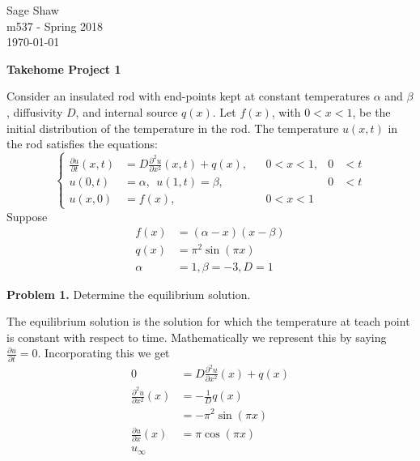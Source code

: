 \documentclass[12pt]{article}
\newcommand{\problem}[1]{\hspace{-4 ex} \large \textbf{Problem #1} }
\begin{document}
	\thispagestyle{empty}
	
	\begin{flushright}
		Sage Shaw \\
		m537 - Spring 2018 \\
		\today
	\end{flushright}
	
{\large \textbf{Takehome Project 1}}\bigbreak

Consider an insulated rod with end-points kept at constant temperatures $\alpha$ and $\beta$, diffusivity $D$, and internal source $q(x)$. Let $f(x)$, with $0<x<1$, be the initial distribution of the temperature in the rod. The temperature $u(x,t)$ in the rod satisfies the equations:
\begin{equation}
 \left \{
	\begin{aligned}
		\frac{\partial u}{\partial t}(x,t) & = D \frac{\partial^2u}{\partial x^2}(x,t) + q(x), && 0 <x <1, & 0&<t \\
		u(0,t) & = \alpha, \ \  u(1,t) = \beta, && & 0 & < t \\
		u(x,0) & = f(x), && 0  < x < 1
	\end{aligned} 
\right .
\end{equation}
Suppose
\begin{align*}
	f(x) & = (\alpha - x)(x- \beta) \\
	 q(x) & = \pi^2\sin(\pi x) \\
	\alpha & = 1, \beta = -3, D=1
\end{align*}

\problem{1.} Determine the equilibrium solution. \bigbreak

The equilibrium solution is the solution for which the temperature at teach point is constant with respect to time. Mathematically we represent this by saying $\frac{\partial u}{\partial t} = 0$. Incorporating this we get
\begin{align*}
0 & = D \frac{\partial^2u}{\partial x^2}(x) + q(x) \\
\frac{\partial^2u}{\partial x^2}(x) & = -\frac{1}{D}q(x) \\
& = -\pi^2 \sin(\pi x) \\
\frac{\partial u}{\partial x}(x) & = \pi \cos(\pi x) \\
u_\infty
\end{align*}
\end{document}
